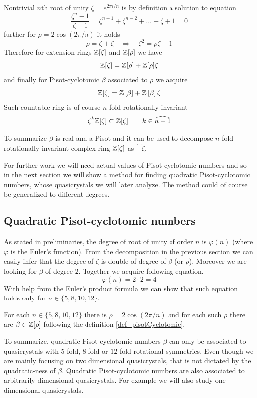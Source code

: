 \documentclass[text.tex]{subfiles}
\begin{document}
Nontrivial $n$th root of unity $\zeta = e^{2\pi i/n}$ is by definition a solution to equation
$$\frac{\zeta^n-1}{\zeta-1} = \zeta^{n-1}+\zeta^{n-2}+\dots+\zeta+1 = 0$$
further for $\rho = 2\cos\left(2\pi/n\right)$ it holds
$$\rho = \zeta + \bar{\zeta}\quad\Rightarrow\quad \zeta^2 = \rho\zeta - 1$$
Therefore for extension rings $\mathbb{Z}[\zeta]$ and $\mathbb{Z}[\rho]$ we have
$$\mathbb{Z}[\zeta] = \mathbb{Z}[\rho] + \mathbb{Z}[\rho]\zeta$$
and finally for Pisot-cyclotomic $\beta$ associated to $\rho$ we acquire
$$\mathbb{Z}[\zeta] = \mathbb{Z}\left[\beta\right] + \mathbb{Z}\left[\beta\right]\zeta$$
Such countable ring is of course $n$-fold rotationally invariant
$$\zeta^k\mathbb{Z}[\zeta] \subset \mathbb{Z}[\zeta]\qquad k\in\widehat{n-1}$$

To summarize $\beta$ is real and a Pisot and it can be used to decompose $n$-fold rotationally invariant complex ring $\mathbb{Z}[\zeta]$ as $\ring + \ring\zeta$. 

For further work we will need actual values of Pisot-cyclotomic numbers and so in the next section we will show a method for finding quadratic Pisot-cyclotomic numbers, whose quasicrystals we will later analyze. The method could of course be generalized to different degrees. 

\subsection{Quadratic Pisot-cyclotomic numbers}
As stated in preliminaries, the degree of root of unity of order $n$ is $\varphi(n)$ (where $\varphi$ is the Euler's function). From the decomposition in the previous section we can easily infer that the degree of $\zeta$ is double of degree of $\beta$ (or $\rho$). Moreover we are looking for $\beta$ of degree $2$. Together we acquire following equation. 
$$\varphi(n) = 2\cdot 2 = 4$$
With help from the Euler's product formula we can show that such equation holds only for $n\in\{5,8,10,12\}$. 

For each $n\in\{5,8,10,12\}$ there is $\rho = 2\cos\left(2\pi/n\right)$ and for each such $\rho$ there are $\beta \in \mathbb{Z}[\rho]$ following the definition \ref{def_pisotCyclotomic}. 

To summarize, quadratic Pisot-cyclotomic numbers $\beta$ can only be associated to quasicrystals with $5$-fold, $8$-fold or $12$-fold rotational symmetries. Even though we are mainly focusing on two dimensional quasicrystals, that is not dictated by the quadratic-ness of $\beta$. Quadratic Pisot-cyclotomic numbers are also associated to arbitrarily dimensional quasicrystals. For example we will also study one dimensional quasicrystals. 
\end{document}
